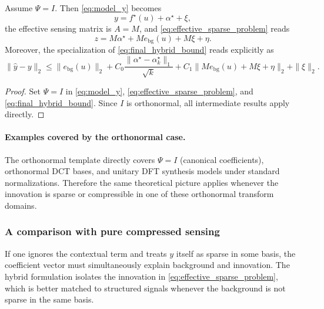 \begin{corollary}
\label{cor:identity_case}
Assume $\Psi=I$.
Then \eqref{eq:model_y} becomes
\begin{equation}
  y = f^\star(u) + \alpha^\star + \xi,
  \label{eq:model_identity_case}
\end{equation}
the effective sensing matrix is $A=M$, and \eqref{eq:effective_sparse_problem} reads
\begin{equation}
  z = M\alpha^\star + M e_{\mathrm{bg}}(u) + M\xi + \eta.
  \label{eq:residual_identity_case}
\end{equation}
Moreover, the specialization of \eqref{eq:final_hybrid_bound} reads explicitly as
\begin{equation}
  \|\widehat{y}-y\|_2
  \le
  \|e_{\mathrm{bg}}(u)\|_2
  +
  C_0 \frac{\|\alpha^\star-\alpha^\star_k\|_1}{\sqrt{k}}
  +
  C_1 \|M e_{\mathrm{bg}}(u)+M\xi+\eta\|_2
  +
  \|\xi\|_2.
  \label{eq:final_bound_identity_case}
\end{equation}
\end{corollary}

\begin{proof}
Set $\Psi=I$ in \eqref{eq:model_y}, \eqref{eq:effective_sparse_problem}, and \eqref{eq:final_hybrid_bound}.
Since $I$ is orthonormal, all intermediate results apply directly.
\end{proof}

\paragraph{Examples covered by the orthonormal case.}
The orthonormal template directly covers $\Psi=I$ (canonical coefficients), orthonormal DCT bases, and unitary DFT synthesis models under standard normalizations.
Therefore the same theoretical picture applies whenever the innovation is sparse or compressible in one of these orthonormal transform domains.

\subsubsection{A comparison with pure compressed sensing}

If one ignores the contextual term and treats $y$ itself as sparse in some basis, the coefficient vector must simultaneously explain background and innovation.
The hybrid formulation isolates the innovation in \eqref{eq:effective_sparse_problem}, which is better matched to structured signals whenever the background is not sparse in the same basis.

